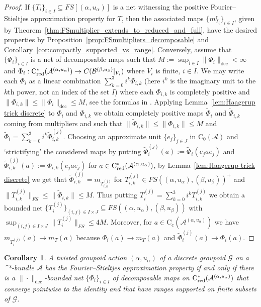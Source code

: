 \documentclass[11 pt, leqno]{amsart}
\numberwithin{equation}{section}
\theoremstyle{plain}
\newtheorem{cor}[thm]{Corollary}
\theoremstyle{definition}
\newcommand*{\contc}{\mathrm{C_c}}%
\newcommand*{\contz}{\mathrm{C_0}}%
\DeclareMathOperator{\red}{red}%
\DeclareMathOperator{\rd}{r}%
\newcommand{\B}{\mathcal B}
\newcommand{\m}{m}
\newcommand{\G}{\mathcal G} %
\newcommand{\A}{\mathcal A}
\newcommand{\cst}{\ifmmode\mathrm{C}^*\else{$\mathrm{C}^*$}\fi}
\begin{document}
\begin{proof} 
If $\{T_{i}\}_{i\in I} \subseteq FS[(\alpha,u_{\alpha})]$ is a net witnessing the positive Fourier--Stieltjes approximation property for $T$, then the associated maps $\{ \m_{T_i}^{\rd} \}_{i\in I}$, given by Theorem~\ref{thm:FSmultiplier_extends_to_reduced_and_full}, have the desired properties by Proposition~\ref{prop:FSmultipliers_decomposable} and Corollary~\ref{cor:compactly_supported_vs_range}. 
Conversely, assume that $\{ \Phi_{i} \}_{i\in I}$ is a net of decomposable maps such that $M := \sup_{i\in I} \| \Phi_i \|_{\mathrm{dec}} < \infty$ and $\Phi_i : \cst_{\red}(\A^{(\alpha,u_\alpha)}) \to C(\B^{(\beta,u_\beta)}|_{V_i})$ where $V_i$ is finite, $i\in I$. 
We may write each $\Phi_i$ as a linear combination $\sum_{k=0}^{3} i^k \Phi_{i,k}$ (here $i^{k}$ is the imaginary unit to the $k$th power, not an index of the set $I$) where each $\Phi_{i,k}$ is completely positive and $\|\Phi_{i,k}\| \leq \|\Phi_i\|_{\mathrm{dec}}\leq M$, see the formulas in \cite[Page 175]{Haagerupdec}. 
Applying Lemma~\ref{lem:Haagerup trick discrete} to $\Phi_{i}$ and $\Phi_{i,k}$ we obtain completely positive maps $\widetilde{\Phi}_{i}$ and $\widetilde{\Phi}_{i,k}$ coming from multipliers and such that $\|\widetilde{\Phi}_{i,k}\|\leq \|\Phi_{i,k}\|\leq M$ and $\widetilde{\Phi}_{i}=\sum_{k=0}^{3} i^k \widetilde{\Phi}_{i,k}^{(j)}$. 
Choosing an approximate unit $\{e_j\}_{j\in J}$ in $\contz(\A)$ and `strictifying' the considered maps by putting $\widetilde{\Phi}_{i}^{(j)}(a) := \widetilde{\Phi}_{i}(e_j a e_j)$ and $\widetilde{\Phi}_{i,k}^{(j)}(a) := \Phi_{i,k}(e_j a e_j)$ for $a\in  \cst_{\red}(\A^{(\alpha,u_\alpha)})$, by Lemma~\ref{lem:Haagerup trick discrete} we get that $\widetilde{\Phi}_{i,k}^{(j)}=\m_{T_{i,k}^{(j)}}$ for $T_{i,k}^{(j)}\in FS((\alpha,u_\alpha), (\beta,u_\beta) )^+$ and $\|T_{i,k}^{(j)}\|_{FS} \leq \|\widetilde{\Phi}_{i,k}\|\leq M$. 
Thus putting $T_{i}^{(j)}= \sum_{k=0}^{3} i^kT_{i,k}^{(j)}$ we obtain a bounded net $\{T_{i}^{(j)}\}_{(i,j)\in I\times J}\subseteq FS((\alpha,u_\alpha), (\beta,u_\beta) )$ with $\sup_{(i,j)\in I\times J}\| T_{i}^{(j)}\|_{FS}\leq 4M$. 
Moreover, for $a \in \contc(\A^{(\alpha,u_\alpha)})$ we have $\m_{T_{i}^{(j)}}(a)\to \m_T(a)$ because $\Phi_i(a)\to m_T(a)$ and $\widetilde{\Phi}_{i}^{(j)}(a) \to \Phi_i(a)$. 
\end{proof}

\begin{cor}\label{cor:characterisation_general_FS_AP_for_discrete}
A twisted groupoid action $(\alpha,u_{\alpha})$ of a discrete groupoid $\G$ on a \cst-bundle $\A$ has the Fourier--Stieltjes approximation property if and only if there is a $\| \cdot \|_{\mathrm{dec}}$-bounded net $\{\Phi_{i}\}_{i\in I}$ of decomposable maps on $\cst_{\red}(\A^{(\alpha,u_{\alpha})})$ that converge pointwise to the identity and that have ranges supported on finite subsets of $\G$. 
\end{cor}
\end{document}
